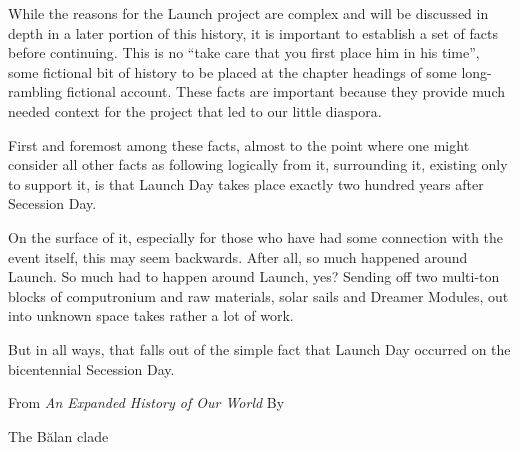   While the reasons for the Launch project are complex and will be discussed in depth in a later portion of this history, it is important to establish a set of facts before continuing. This is no “take care that you first place him in his time”, some fictional bit of history to be placed at the chapter headings of some long-rambling fictional account. These facts are important because they provide much needed context for the project that led to our little diaspora.

  First and foremost among these facts, almost to the point where one might consider all other facts as following logically from it, surrounding it, existing only to support it, is that Launch Day takes place exactly two hundred years after Secession Day.

  On the surface of it, especially for those who have had some connection with the event itself, this may seem backwards. After all, so much happened around Launch. So much had to happen around Launch, yes? Sending off two multi-ton blocks of computronium and raw materials, solar sails and Dreamer Modules, out into unknown space takes rather a lot of work.

  But in all ways, that falls out of the simple fact that Launch Day occurred on the bicentennial Secession Day.

  \vspace{1em}
  
  From \emph{An Expanded History of Our World} By

  The Bălan clade

  \vfill
  




